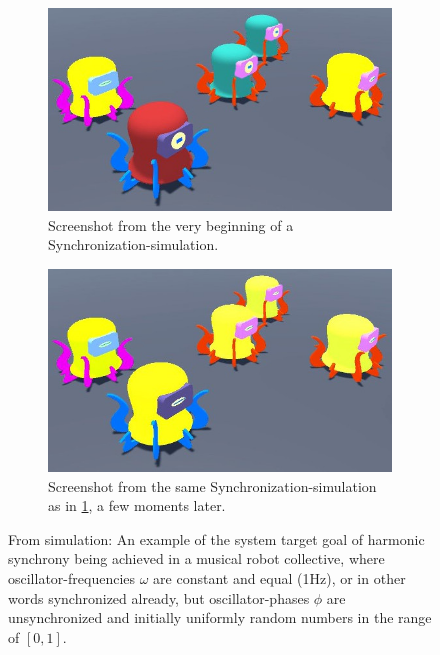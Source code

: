 	\begin{figure}[ht!]
		\centering
			\begin{subfigure}[t]{.5\textwidth}
				\centering\captionsetup{width=.9\linewidth}%
				\includegraphics[width=0.9\linewidth]{Assets/Figures/Simulations/squiggles_unsynched_in_simulation.jpg}
				\caption{Screenshot from the very beginning of a Synchronization-simulation.}
				\label{fig:first_idea:second_fig:unsynched}
			\end{subfigure}%
			\begin{subfigure}[t]{.5\textwidth}
				\centering\captionsetup{width=.9\linewidth}%
				\includegraphics[width=0.9\linewidth]{Assets/Figures/Simulations/squiggles_synched_in_simulation.jpg}
				\caption{Screenshot from the same Synchronization-simulation as in \ref{fig:first_idea:second_fig:unsynched}, a few moments later.}
				\label{fig:first_idea:second_fig:synched}
			\end{subfigure}
		\caption[Synchronization-example/-screenshots from simulation in Unity]{From simulation: An example of the system target goal of harmonic synchrony being achieved in a musical robot collective, where oscillator-frequencies $\omega$ are constant and equal (1Hz), or in other words synchronized already, but oscillator-phases $\phi$ are unsynchronized and initially uniformly random numbers in the range of $[0,1]$. \nl
}
\end{figure}
